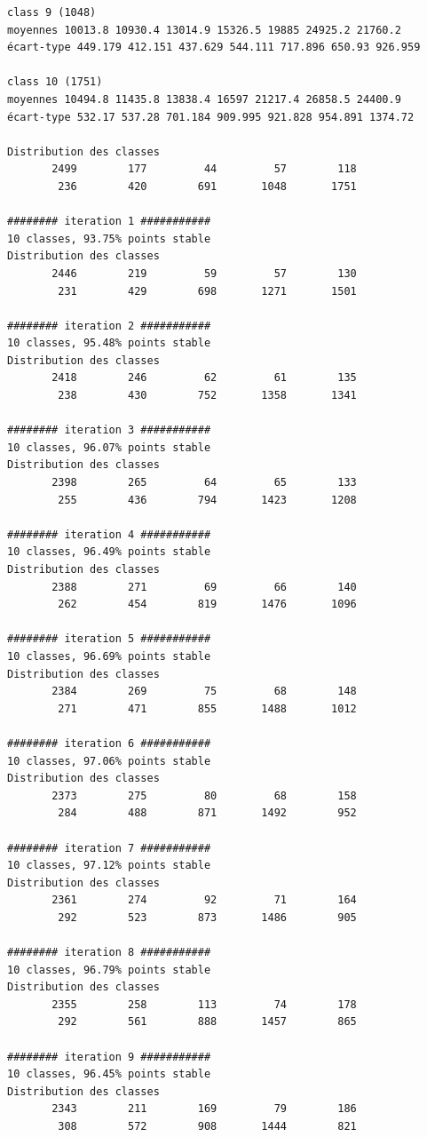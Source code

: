 \documentclass[earth,article,submit,pdftex,moreauthors]{Definitions/mdpi}
\begin{document}
{\begin{scriptsize}
\begin{verbatim}
class 9 (1048)
moyennes 10013.8 10930.4 13014.9 15326.5 19885 24925.2 21760.2
écart-type 449.179 412.151 437.629 544.111 717.896 650.93 926.959

class 10 (1751)
moyennes 10494.8 11435.8 13838.4 16597 21217.4 26858.5 24400.9
écart-type 532.17 537.28 701.184 909.995 921.828 954.891 1374.72

Distribution des classes
       2499        177         44         57        118
        236        420        691       1048       1751

######## iteration 1 ###########
10 classes, 93.75% points stable
Distribution des classes
       2446        219         59         57        130
        231        429        698       1271       1501

######## iteration 2 ###########
10 classes, 95.48% points stable
Distribution des classes
       2418        246         62         61        135
        238        430        752       1358       1341

######## iteration 3 ###########
10 classes, 96.07% points stable
Distribution des classes
       2398        265         64         65        133
        255        436        794       1423       1208

######## iteration 4 ###########
10 classes, 96.49% points stable
Distribution des classes
       2388        271         69         66        140
        262        454        819       1476       1096

######## iteration 5 ###########
10 classes, 96.69% points stable
Distribution des classes
       2384        269         75         68        148
        271        471        855       1488       1012

######## iteration 6 ###########
10 classes, 97.06% points stable
Distribution des classes
       2373        275         80         68        158
        284        488        871       1492        952

######## iteration 7 ###########
10 classes, 97.12% points stable
Distribution des classes
       2361        274         92         71        164
        292        523        873       1486        905

######## iteration 8 ###########
10 classes, 96.79% points stable
Distribution des classes
       2355        258        113         74        178
        292        561        888       1457        865

######## iteration 9 ###########
10 classes, 96.45% points stable
Distribution des classes
       2343        211        169         79        186
        308        572        908       1444        821


\end{verbatim}
\end{scriptsize}}
\end{document}
